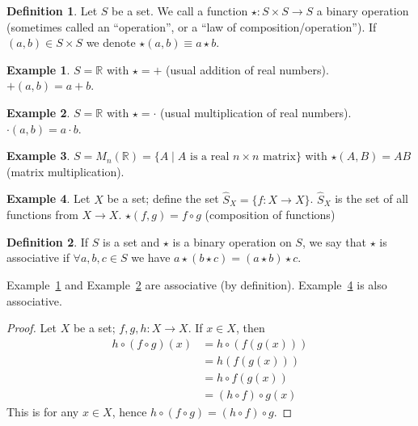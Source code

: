 \documentclass[12pt,letterpaper,DIV=11,final]{scrartcl}
\theoremstyle{plain}
\theoremstyle{definition}
\newtheorem{definition}{Definition}[section]
\newtheorem{example}{Example}[section]
\theoremstyle{remark}
\begin{document}
\begin{definition}\label{def:lawofcompositon}
  Let $S$ be a set.
  We call a function $\star : S \times S \to S$ a binary operation (sometimes called an \enquote{operation}, or a \enquote{law of composition/operation}).
  If $(a, b) \in S \times S$ we denote $\star(a, b) \equiv a \star b$.
\end{definition}

\begin{example}\label{ex:add}
  $S = \mathbb{R}$ with $\star = +$ (usual addition of real numbers). $+(a, b) = a + b$.
\end{example}

\begin{example}\label{ex:mul}
  $S = \mathbb{R}$ with $\star = \cdot$ (usual multiplication of real numbers). $\cdot(a, b) = a \cdot b$.
\end{example}

\begin{example}\label{ex:matmul}
  $S = M_n(\mathbb{R}) = \{A \mid A \text{ is a real } n \times n \text{ matrix} \}$ with $\star(A, B) = AB$ (matrix multiplication).
\end{example}

\begin{example}\label{ex:funccomp}
  Let $X$ be a set; define the set $\hat{S}_X = \{f : X \to X\}$.
  $\hat{S}_X$ is the set of all functions from $X \to X$.
  $\star(f, g) = f \circ g$ (composition of functions)
\end{example}

\begin{definition}
  If $S$ is a set and $\star$ is a binary operation on $S$, we say that $\star$ is associative if $\forall a, b, c \in S$ we have $a \star (b \star c) = (a \star b) \star c$.
\end{definition}

Example~\ref{ex:add} and Example~\ref{ex:mul} are associative (by definition).
Example~\ref{ex:funccomp} is also associative.
\begin{proof}
  Let $X$ be a set; $f, g, h : X \to X$.
  If $x \in X$, then
  \begin{align*}
    h \circ (f \circ g)(x) &= h \circ (f(g(x))) \\
                           &= h(f(g(x))) \\
                           &= h \circ f(g(x)) \\
                           &= (h \circ f) \circ g(x)
  \end{align*}
  This is for any $x \in X$, hence $h \circ (f \circ g) = (h \circ f) \circ g$.
\end{proof}
\end{document}
